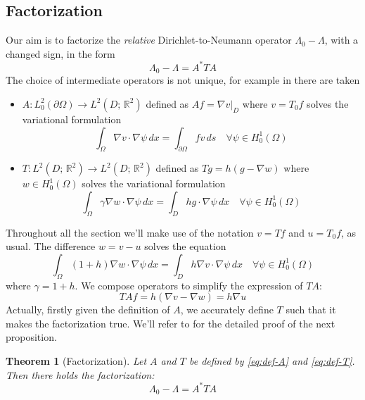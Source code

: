 \documentclass[10pt, a4paper, twoside, openright]{book}
\theoremstyle{definition}
\theoremstyle{plain}
\newtheorem{theorem}[subsection]{Theorem}
\theoremstyle{plain}
\theoremstyle{plain}
\theoremstyle{plain}
\theoremstyle{plain}
\theoremstyle{plain}
\theoremstyle{plain}
\theoremstyle{plain}
\begin{document}
\subsection{Factorization}
Our aim is to factorize the \textit{relative} Dirichlet-to-Neumann operator $\Lambda_0 - \Lambda$, with a changed sign, in the form
\begin{equation}
 \Lambda_0 - \Lambda = A^*TA
\end{equation}
The choice of intermediate operators is not unique, for example in \cite{kirsch:book} there are taken
\begin{itemize}
 \item $A:L^2_0(\partial \Omega) \to L^2(D;\,\mathbb{R}^2)$ defined as $Af = \nabla v|_D$ where $v = T_0f$ solves the variational formulation
 \begin{equation}
  \label{eq:def-A}
  \int_\Omega \nabla v\cdot \nabla \psi \, dx = \int_{\partial \Omega} fv\, ds\quad \forall\psi\in H^1_0(\Omega)
 \end{equation}
 \item $T:L^2(D;\,\mathbb{R}^2) \to L^2(D;\,\mathbb{R}^2)$ defined as $Tg = h(g - \nabla w)$ where $w\in H^1_0(\Omega)$ solves the variational formulation
 \begin{equation}
  \label{eq:def-T}
  \int_\Omega \gamma \nabla w\cdot \nabla \psi \, dx = \int_D hg\cdot\nabla\psi\, dx\quad \forall\psi\in H^1_0(\Omega)
 \end{equation}
\end{itemize}
Throughout all the section we'll make use of the notation $v=Tf$ and $u=T_0f$, as usual.
The difference $w = v - u$ solves the equation
\begin{equation}
 \int_\Omega(1+h)\nabla w\cdot\nabla\psi\, dx = \int_D h\nabla v \cdot \nabla \psi\, dx\quad \forall\psi\in H^1_0(\Omega)
\end{equation}
where $\gamma = 1 + h$.
We compose operators to simplify the expression of $TA$:
\begin{equation}
 TAf = h (\nabla v - \nabla w) = h \nabla u
\end{equation}
Actually, firstly given the definition of $A$, we accurately define $T$ such that it makes the factorization true.
We'll refer to \cite{kirsch:book} for the detailed proof of the next proposition.
\begin{theorem}[Factorization]
 Let $A$ and $T$ be defined by \ref{eq:def-A} and \ref{eq:def-T}. Then there holds the factorization:
\begin{equation}
 \Lambda_0 - \Lambda = A^*TA
\end{equation}
\end{theorem}
\end{document}
